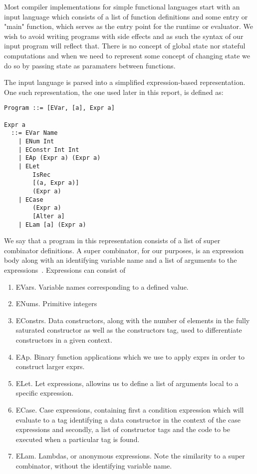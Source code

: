 Most compiler implementations for simple functional languages start with an 
input language which consists of a list of function definitions and some entry
or "main" function, which serves as the entry point for the runtime or evaluator.
We wish to avoid writing programs with side effects and as such the syntax of
our input program will reflect that. There is no concept of global state nor
stateful computations and when we need to represent some concept of changing
state we do so by passing state as paramaters between functions. 

The input language is parsed into a simplified expression-based representation.
One such representation, the one used later in this report, is defined as:

\begin{verbatim}
Program ::= [EVar, [a], Expr a]

Expr a
  ::= EVar Name
    | ENum Int
    | EConstr Int Int
    | EAp (Expr a) (Expr a)
    | ELet 
        IsRec
        [(a, Expr a)]
        (Expr a)
    | ECase
        (Expr a)
        [Alter a]
    | ELam [a] (Expr a)
\end{verbatim}

\noindent We say that a program in this representation consists of a list of
super combinator definitions. A super combinator, for our purposes, is an 
expression body along with an identifying variable name and a list of arguments
to the expressions~\cite[pp.12]{Tutorial}. Expressions can consist of

\begin{enumerate}
	\item EVars. Variable names corresponding to a defined value.
	\item ENums. Primitive integers
	\item EConstrs. Data constructors, along with the number of elements in the
		  fully saturated constructor as well as the constructors tag, used to
		  differentiate constructors in a given context.
	\item EAp. Binary function applications which we use to apply exprs in order
		  to construct larger exprs.
	\item ELet. Let expressions, allowins us to define a list of arguments local
		  to a specific expression.
	\item ECase. Case expressions, containing first a condition expression which
		  will evaluate to a tag identifying a data constructor in the context
		  of the case expressions and secondly, a list of constructor tags and 
		  the code to be executed when a particular tag is found.
	\item ELam. Lambdas, or anonymous expressions. Note the similarity to a 
		  super combinator, without the identifying variable name.
\end{enumerate}

